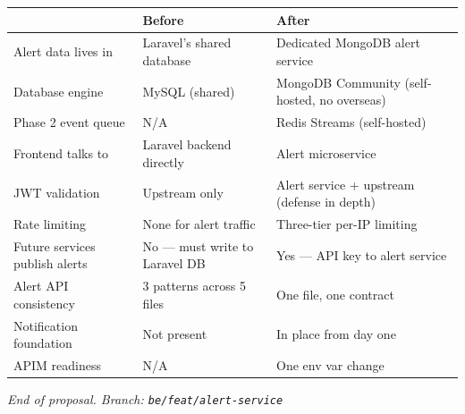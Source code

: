 \documentclass[11pt]{article}
\begin{document}
\begin{table}[h]
\small
\begin{tabularx}{\textwidth}{l X X}
\toprule
 & \textbf{Before} & \textbf{After} \\
\midrule
Alert data lives in & Laravel's shared database & Dedicated MongoDB alert service \\
Database engine & MySQL (shared) & MongoDB Community (self-hosted, no overseas) \\
Phase 2 event queue & N/A & Redis Streams (self-hosted) \\
Frontend talks to & Laravel backend directly & Alert microservice \\
JWT validation & Upstream only & Alert service + upstream (defense in depth) \\
Rate limiting & None for alert traffic & Three-tier per-IP limiting \\
Future services publish alerts & No --- must write to Laravel DB & Yes --- API key to alert service \\
Alert API consistency & 3 patterns across 5 files & One file, one contract \\
Notification foundation & Not present & In place from day one \\
APIM readiness & N/A & One env var change \\
\bottomrule
\end{tabularx}
\end{table}

\vspace{0.8cm}
\noindent\textit{End of proposal. \quad Branch: \texttt{be/feat/alert-service}}
\end{document}
